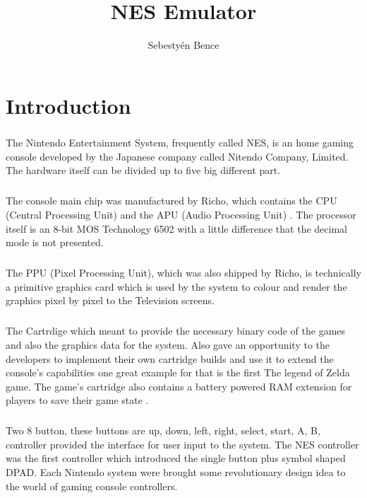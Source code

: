 \documentclass[]{report}
\title{NES Emulator}
\author{Sebestyén Bence}
\begin{document}
\maketitle

\tableofcontents

\clearpage

\chapter{Introduction}

\paragraph{}
The Nintendo Entertainment System, frequently called NES, is an home gaming console developed by the Japanese company called Nitendo Company, Limited. The hardware itself can be divided up to five big different part. 
\paragraph{ }
The console main chip was manufactured by Richo, which contains the CPU (Central Processing Unit) and the APU (Audio Processing Unit) \cite{CPU}.  
The processor itself is an 8-bit MOS Technology 6502 with a little difference that the decimal mode is not presented. 
\paragraph{ }
The PPU (Pixel Processing Unit), which was also shipped by Richo, is technically a primitive graphics card which is used by the system to colour and render the graphics pixel by pixel to the Television screens.
\paragraph{ }
The Cartrdige which meant to provide the necessary binary code of the games and also the graphics data for the system. Also gave an opportunity to the developers to implement their own cartridge builds and use it to extend the console's capabilities one great example for that is the first The legend of Zelda game. The game's cartridge also contains a battery powered RAM extension for players to save their game state \cite{ZELD}.
\paragraph{ }
Two 8 button, these buttons are up, down, left, right, select, start, A, B, controller provided the interface for user input to the system. The NES controller was the first controller which introduced the single button plus symbol shaped DPAD. Each Nintendo system were brought some revolutionary design idea to the world of gaming console controllers.
\end{document}
